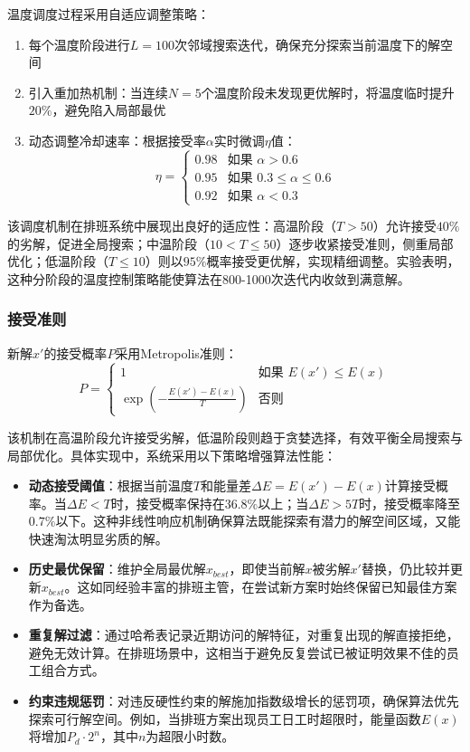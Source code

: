 \documentclass{ctexart}
\begin{document}
温度调度过程采用自适应调整策略：
\begin{enumerate}
    \item 每个温度阶段进行$L=100$次邻域搜索迭代，确保充分探索当前温度下的解空间
    \item 引入重加热机制：当连续$N=5$个温度阶段未发现更优解时，将温度临时提升$20\%$，避免陷入局部最优
    \item 动态调整冷却速率：根据接受率$\alpha$实时微调$\eta$值：
    \begin{equation}
    \eta = \begin{cases}
    0.98 & \text{如果 } \alpha > 0.6 \\
    0.95 & \text{如果 } 0.3 \leq \alpha \leq 0.6 \\
    0.92 & \text{如果 } \alpha < 0.3
    \end{cases}
    \end{equation}
\end{enumerate}

该调度机制在排班系统中展现出良好的适应性：高温阶段（$T>50$）允许接受$40\%$的劣解，促进全局搜索；中温阶段（$10<T\leq50$）逐步收紧接受准则，侧重局部优化；低温阶段（$T\leq10$）则以$95\%$概率接受更优解，实现精细调整。实验表明，这种分阶段的温度控制策略能使算法在800-1000次迭代内收敛到满意解。

\subsubsection{接受准则}
新解$x'$的接受概率$P$采用Metropolis准则：
\begin{equation}
P = \begin{cases}
1 & \text{如果 } E(x') \leq E(x) \\
\exp\left(-\frac{E(x')-E(x)}{T}\right) & \text{否则}
\end{cases}
\end{equation}

该机制在高温阶段允许接受劣解，低温阶段则趋于贪婪选择，有效平衡全局搜索与局部优化。具体实现中，系统采用以下策略增强算法性能：

\begin{itemize}
    \item \textbf{动态接受阈值}：根据当前温度$T$和能量差$\Delta E = E(x')-E(x)$计算接受概率。当$\Delta E < T$时，接受概率保持在$36.8\%$以上；当$\Delta E > 5T$时，接受概率降至$0.7\%$以下。这种非线性响应机制确保算法既能探索有潜力的解空间区域，又能快速淘汰明显劣质的解。

    \item \textbf{历史最优保留}：维护全局最优解$x_{best}$，即使当前解$x$被劣解$x'$替换，仍比较并更新$x_{best}$。这如同经验丰富的排班主管，在尝试新方案时始终保留已知最佳方案作为备选。

    \item \textbf{重复解过滤}：通过哈希表记录近期访问的解特征，对重复出现的解直接拒绝，避免无效计算。在排班场景中，这相当于避免反复尝试已被证明效果不佳的员工组合方式。

    \item \textbf{约束违规惩罚}：对违反硬性约束的解施加指数级增长的惩罚项，确保算法优先探索可行解空间。例如，当排班方案出现员工日工时超限时，能量函数$E(x)$将增加$P_d \cdot 2^{n}$，其中$n$为超限小时数。
\end{itemize}
\end{document}

